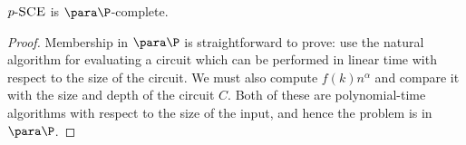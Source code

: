 \documentclass{article}
\newcommand{\dash}{\textnormal{-}}
\newcommand{\pSCE}{p \dash \textsc{SCE}}
\begin{document}
\begin{theorem}\label{thm:psce}
  $\pSCE$ is $\para \P$-complete.
\end{theorem}
\begin{proof}
  Membership in $\para \P$ is straightforward to prove: use the natural algorithm for evaluating a circuit which can be performed in linear time with respect to the size of the circuit.
  We must also compute $f(k) n^\alpha$ and compare it with the size and depth of the circuit $C$.
  Both of these are polynomial-time algorithms with respect to the size of the input, and hence the problem is in $\para \P$.




\end{proof}
\end{document}
